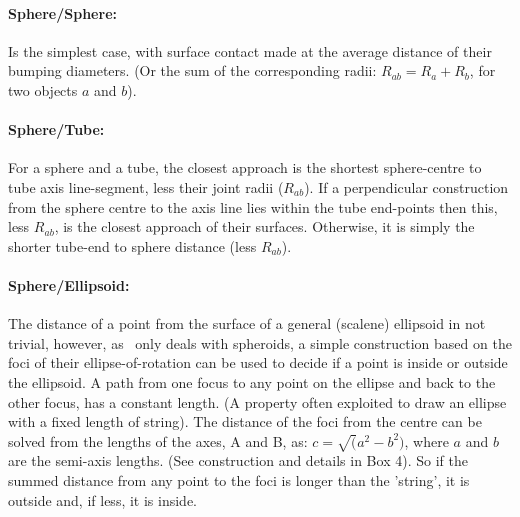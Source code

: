 {{{{{\paragraph{Sphere/Sphere:\\}

Is the simplest case, with surface contact made at the average distance of their bumping diameters.
(Or the sum of the corresponding radii: $R_{ab} = R_a + R_b$, for two objects $a$ and $b$).

\paragraph{Sphere/Tube:\\}

For a sphere and a tube, the closest approach is the shortest sphere-centre to tube axis 
line-segment, less their joint radii ($R_{ab}$).   If a perpendicular construction from the 
sphere centre to the axis line lies within the tube end-points then this, less $R_{ab}$,
is the closest approach of their surfaces.  Otherwise, it is simply the shorter tube-end to
sphere distance (less $R_{ab}$).

\paragraph{Sphere/Ellipsoid:\\}

The distance of a point from the surface of a general (scalene) ellipsoid in not trivial,
however, as \NAME\ only deals with spheroids, a simple construction based on the foci of
their ellipse-of-rotation can be used to decide if a point is inside or outside the ellipsoid.
A path from one focus to any point on the ellipse and back to the other focus, has a constant
length.  (A property often exploited to draw an ellipse with a fixed length of string).
The distance of the foci from the centre can be solved from the lengths of the axes, A and B,
as: $c = \surd(a^2-b^2)$, where $a$ and $b$ are the semi-axis lengths.  (See construction and details in Box 4).
So if the summed distance from any point to the foci is longer than the 'string', it is outside
and, if less, it is inside.

}}}}}
